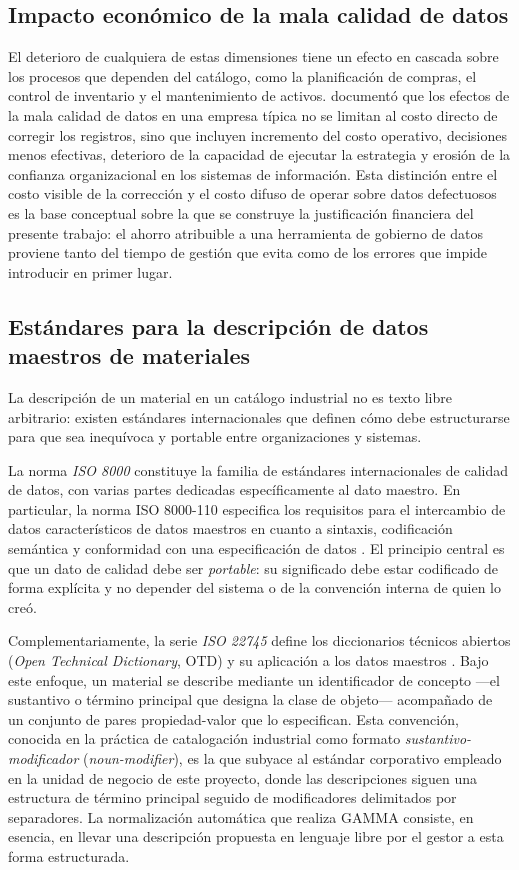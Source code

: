 \subsection{Impacto económico de la mala calidad de datos}
El deterioro de cualquiera de estas dimensiones tiene un efecto en cascada sobre los procesos que dependen del catálogo, como la planificación de compras, el control de inventario y el mantenimiento de activos.  documentó que los efectos de la mala calidad de datos en una empresa típica no se limitan al costo directo de corregir los registros, sino que incluyen incremento del costo operativo, decisiones menos efectivas, deterioro de la capacidad de ejecutar la estrategia y erosión de la confianza organizacional en los sistemas de información. Esta distinción entre el costo visible de la corrección y el costo difuso de operar sobre datos defectuosos es la base conceptual sobre la que se construye la justificación financiera del presente trabajo: el ahorro atribuible a una herramienta de gobierno de datos proviene tanto del tiempo de gestión que evita como de los errores que impide introducir en primer lugar.

\subsection{Estándares para la descripción de datos maestros de materiales}
La descripción de un material en un catálogo industrial no es texto libre arbitrario: existen estándares internacionales que definen cómo debe estructurarse para que sea inequívoca y portable entre organizaciones y sistemas.

La norma \textit{ISO 8000} constituye la familia de estándares internacionales de calidad de datos, con varias partes dedicadas específicamente al dato maestro. En particular, la norma ISO 8000-110 especifica los requisitos para el intercambio de datos característicos de datos maestros en cuanto a sintaxis, codificación semántica y conformidad con una especificación de datos \cite{iso8000110}. El principio central es que un dato de calidad debe ser \textit{portable}: su significado debe estar codificado de forma explícita y no depender del sistema o de la convención interna de quien lo creó.

Complementariamente, la serie \textit{ISO 22745} define los diccionarios técnicos abiertos (\textit{Open Technical Dictionary}, OTD) y su aplicación a los datos maestros \cite{iso22745}. Bajo este enfoque, un material se describe mediante un identificador de concepto —el sustantivo o término principal que designa la clase de objeto— acompañado de un conjunto de pares propiedad-valor que lo especifican. Esta convención, conocida en la práctica de catalogación industrial como formato \textit{sustantivo-modificador} (\textit{noun-modifier}), es la que subyace al estándar corporativo empleado en la unidad de negocio de este proyecto, donde las descripciones siguen una estructura de término principal seguido de modificadores delimitados por separadores. La normalización automática que realiza GAMMA consiste, en esencia, en llevar una descripción propuesta en lenguaje libre por el gestor a esta forma estructurada.

